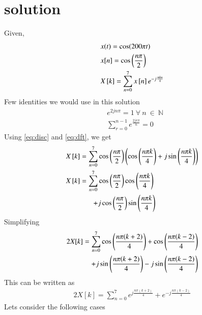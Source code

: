 \documentclass[journal,12pt,twocolumn]{IEEEtran}
\begin{document}
\section{solution} 
Given,
\begin{align}
    &x(t)=\cos(200\pi t)\\
    &x[n]=\cos\left(\frac{n\pi}{2}\right)\label{eq:disc} \\
    &X{}\left[k\right]=\displaystyle \sum_{n=0}^7 x{}\left[n\right]e^{-j\frac{\pi kn}{4}}\label{eq:dft}
\end{align}
Few identities we would use in this solution
\begin{align}
    &e^{2jn\pi}=1\ \forall \ n\ \in\ \mathbb{N}\label{eq:val1}\\
    &\displaystyle \sum_{r=0}^{n-1}e^{\frac{2jr\pi}{n}}=0 \label{eq:sume}
\end{align}
Using \eqref{eq:disc} and \eqref{eq:dft}, we get
\begin{align}
    X{}\left[k\right]=\displaystyle \sum_{n=0}^7& \cos\left(\frac{n\pi}{2}\right)\left(\cos\left(\frac{n\pi k}{4}\right)+j\sin\left(\frac{n\pi k}{4}\right)\right)\\
    X{}\left[k\right]=\displaystyle \sum_{n=0}^7& \cos\left(\frac{n\pi}{2}\right)\cos\left(\frac{n\pi k}{4}\right)\nonumber\\
    +&j\cos\left(\frac{n\pi}{2}\right)\sin\left(\frac{n\pi k}{4}\right)
\end{align}
Simplifying
\begin{align}
    2X[k]=\displaystyle \sum_{n=0}^7 \cos\left(\frac{n\pi(k+2)}{4}\right)+\cos\left(\frac{n\pi (k-2)}{4}\right)\nonumber \\
    +j\sin\left(\frac{n\pi(k+2)}{4}\right)-j\sin\left(\frac{n\pi (k-2)}{4}\right)
\end{align}
This can be written as
\begin{align}
    2X[k]= \displaystyle \sum_{n=0}^7 e^{j\frac{n\pi(k+2)}{4}}+e^{-j\frac{n\pi(k-2)}{4}}
\end{align}
Lets consider the following cases
\end{document}
